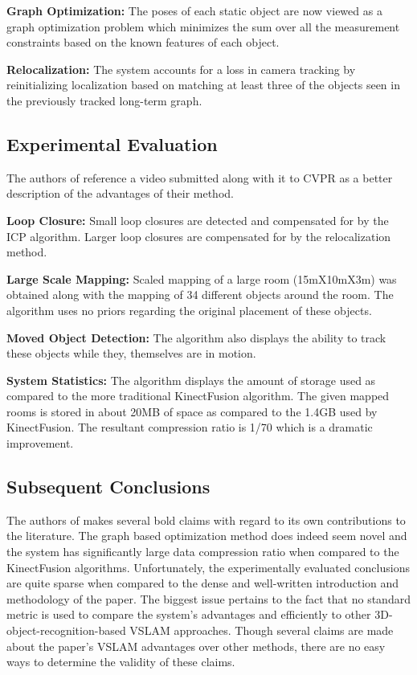 \documentclass[10pt,twocolumn,letterpaper]{article}
\begin{document}
\textbf{Graph Optimization:} The poses of each static object are now viewed as a graph optimization problem which minimizes the sum over all the measurement constraints based on the known features of each object.

\textbf{Relocalization:} The system accounts for a loss in camera tracking by reinitializing localization based on matching at least three of the objects seen in the previously tracked long-term graph. 

\subsection{Experimental Evaluation}
The authors of \cite{Salas-Moreno_2013_CVPR} reference a video submitted along with it to CVPR as a better description of the advantages of their method. 

\textbf{Loop Closure:} Small loop closures are detected and compensated for by the ICP algorithm. Larger loop closures are compensated for by the relocalization method. 

\textbf{Large Scale Mapping:} Scaled mapping of a large room (15mX10mX3m) was obtained along with the mapping of 34 different objects around the room. The algorithm uses no priors regarding the original placement of these objects.

\textbf{Moved Object Detection:} The algorithm also displays the ability to track these objects while they, themselves are in motion. 

\textbf{System Statistics:} The algorithm displays the amount of storage used as compared to the more traditional KinectFusion algorithm. The given mapped rooms is stored in about 20MB of space as compared to the 1.4GB used by KinectFusion. The resultant compression ratio is 1/70 which is a dramatic improvement. 

\subsection{Subsequent Conclusions}
The authors of \cite{Salas-Moreno_2013_CVPR} makes several bold claims with regard to its own contributions to the literature. The graph based optimization method does indeed seem novel and the system has significantly large data compression ratio when compared to the KinectFusion algorithms. Unfortunately, the experimentally evaluated conclusions are quite sparse when compared to the dense and well-written introduction and methodology of the paper. The biggest issue pertains to the fact that no standard metric is used to compare the system's advantages and efficiently to other 3D-object-recognition-based VSLAM approaches. Though several claims are made about the paper's VSLAM advantages over other methods, there are no easy ways to determine the validity of these claims.
\end{document}
